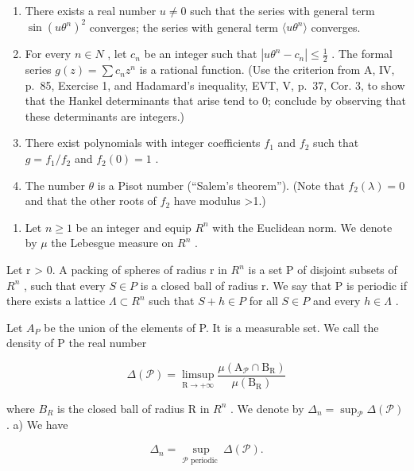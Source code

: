 \begin{enumerate}
\def\labelenumi{\alph{enumi})}
\setcounter{enumi}{7}
\item
  There exists a real number \(u \neq 0\) such that the series with general term \(\sin(u\theta^{n})^{2}\) converges; the series with general term \(\langle u\theta^{n}\rangle\) converges.
\item
  For every \(n \in N\) , let \(c_{n}\) be an integer such that \(|u\theta^{n} - c_{n}| \leqslant \frac{1}{2}\) . The formal series \(g(z) = \sum c_{n}z^{n}\) is a rational function. (Use the criterion from A, IV, p.~85, Exercise 1, and Hadamard's inequality, EVT, V, p.~37, Cor. 3, to show that the Hankel determinants that arise tend to 0; conclude by observing that these determinants are integers.)
\item
  There exist polynomials with integer coefficients \(f_1\) and \(f_2\) such that \(g = f_1 / f_2\) and \(f_2(0) = 1\) .
\item
  The number \(\theta\) is a Pisot number (“Salem’s theorem”). (Note that \(f_{2}(\lambda)=0\) and that the other roots of \(f_{2}\) have modulus \textgreater1.)
\end{enumerate}

\begin{enumerate}
\def\labelenumi{\arabic{enumi})}
\setcounter{enumi}{58}
\tightlist
\item
  Let \(n \geqslant 1\) be an integer and equip \(R^{n}\) with the Euclidean norm. We denote by \(\mu\) the Lebesgue measure on \(R^{n}\) .
\end{enumerate}

Let r \textgreater{} 0. A packing of spheres of radius r in \(R^{n}\) is a set P of disjoint subsets of \(R^{n}\) , such that every \(S \in P\) is a closed ball of radius r. We say that P is periodic if there exists a lattice \(\Lambda \subset R^{n}\) such that \(S + h \in P\) for all \(S \in P\) and every \(h \in \Lambda\) .

Let \(A _{P}\) be the union of the elements of P. It is a measurable set. We call the density of P the real number

\[
\Delta (\mathcal {P}) = \limsup _ {\mathrm{R} \to + \infty} \frac {\mu (\mathrm{A} _ {\mathcal {P}} \cap \mathrm{B} _ {\mathrm{R}})}{\mu (\mathrm{B} _ {\mathrm{R}})}
\]

where \(B_{R}\) is the closed ball of radius R in \(R^{n}\) . We denote by \(\Delta_{n} = \sup_{\mathcal{P}} \Delta(\mathcal{P})\) . a) We have

\[
\Delta_ {n} = \sup _ {\mathcal {P} \text {   periodic }} \Delta (\mathcal {P}).
\]


